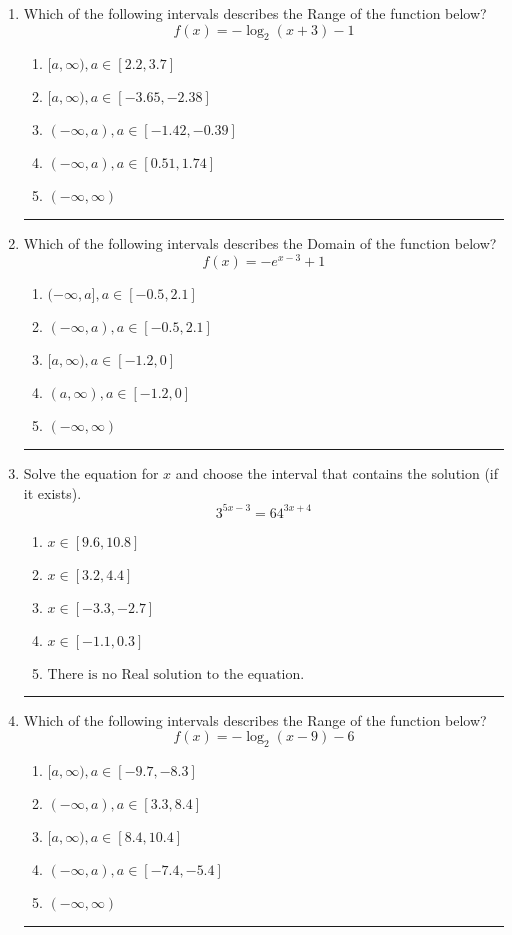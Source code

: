 \documentclass[14pt]{extbook}
\newcommand{\litem}[1]{\item#1\hspace*{-1cm}\rule{\textwidth}{0.4pt}}
\begin{document}
\begin{enumerate}
\litem{
Which of the following intervals describes the Range of the function below?\[ f(x) = -\log_2{(x+3)}-1 \]\begin{enumerate}[label=\Alph*.]
\item \( [a, \infty), a \in [2.2, 3.7] \)
\item \( [a, \infty), a \in [-3.65, -2.38] \)
\item \( (-\infty, a), a \in [-1.42, -0.39] \)
\item \( (-\infty, a), a \in [0.51, 1.74] \)
\item \( (-\infty, \infty) \)

\end{enumerate} }
\litem{
Which of the following intervals describes the Domain of the function below?\[ f(x) = -e^{x-3}+1 \]\begin{enumerate}[label=\Alph*.]
\item \( (-\infty, a], a \in [-0.5, 2.1] \)
\item \( (-\infty, a), a \in [-0.5, 2.1] \)
\item \( [a, \infty), a \in [-1.2, 0] \)
\item \( (a, \infty), a \in [-1.2, 0] \)
\item \( (-\infty, \infty) \)

\end{enumerate} }
\litem{
Solve the equation for $x$ and choose the interval that contains the solution (if it exists).\[ 3^{5x-3} = 64^{3x+4} \]\begin{enumerate}[label=\Alph*.]
\item \( x \in [9.6, 10.8] \)
\item \( x \in [3.2, 4.4] \)
\item \( x \in [-3.3, -2.7] \)
\item \( x \in [-1.1, 0.3] \)
\item \( \text{There is no Real solution to the equation.} \)

\end{enumerate} }
\litem{
Which of the following intervals describes the Range of the function below?\[ f(x) = -\log_2{(x-9)}-6 \]\begin{enumerate}[label=\Alph*.]
\item \( [a, \infty), a \in [-9.7, -8.3] \)
\item \( (-\infty, a), a \in [3.3, 8.4] \)
\item \( [a, \infty), a \in [8.4, 10.4] \)
\item \( (-\infty, a), a \in [-7.4, -5.4] \)
\item \( (-\infty, \infty) \)


\end{enumerate}}
\end{enumerate}
\end{document}
